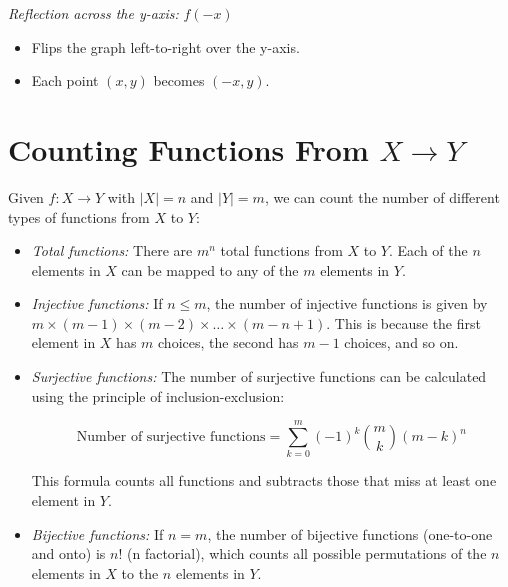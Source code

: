 \emph{Reflection across the y-axis:} \( f(-x) \)

\begin{itemize}

	\item Flips the graph left-to-right over the y-axis.

	\item Each point \( (x, y) \) becomes \( (-x, y) \).

\end{itemize}

\section{Counting Functions From \texorpdfstring{\(X \to Y\)}{X to Y}}

Given \(f: X \to Y\) with \(|X| = n\) and \(|Y| = m\), we can count the number of different types of functions from
\(X\) to \(Y\):

\begin{itemize}

	\item \emph{Total functions:} There are \(m^n\) total functions from \(X\) to \(Y\). Each of the \(n\) elements in
	      \(X\) can be mapped to any of the \(m\) elements in \(Y\).

	\item \emph{Injective functions:} If \(n \leq m\), the number of injective functions is given by
	      \(m \times (m-1) \times (m-2) \times \ldots \times (m-n+1)\). This is because the first element in \(X\) has \(m\) choices, the second has \(m-1\)
	      choices, and so on.

	\item \emph{Surjective functions:} The number of surjective functions can be calculated using the
	      principle of inclusion-exclusion:

	      \[
		      \text{Number of surjective functions} = \sum_{k=0}^{m} (-1)^k \binom{m}{k} (m-k)^n
	      \]

	      This formula counts all functions and subtracts those that miss at least one element in \(Y\).

	\item \emph{Bijective functions:} If \(n = m\), the number of bijective functions (one-to-one and onto) is
	      \(n!\) (n factorial), which counts all possible permutations of the \(n\) elements in \(X\) to the \(n\) elements in \(Y\).

\end{itemize}
